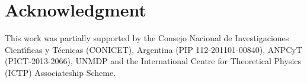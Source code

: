 \documentclass[preprint]{elsarticle}
\begin{document}
















\section*{Acknowledgment}

This work was partially  supported  by  the  Consejo  Nacional de
Investigaciones Cient\'{\i}ficas y T\'ecnicas (CONICET), Argentina
(PIP 112-201101-00840), ANPCyT (PICT-2013-2066), UNMDP and the International Centre for Theoretical Physics (ICTP) Associateship Scheme.\\



\end{document}
